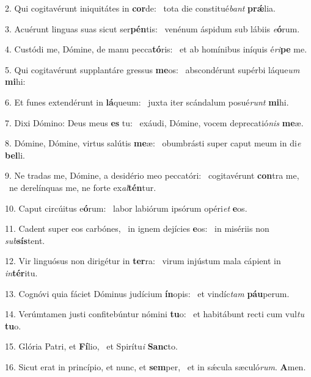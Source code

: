 2. Qui cogitavérunt iniquitátes in \textbf{cor}de: \ast\  tota die constitué\textit{bant} \textbf{prǽ}lia.\

3. Acuérunt linguas suas sicut ser\textbf{pén}tis: \ast\  venénum áspidum sub lábiis \textit{e}\textbf{ó}rum.\

4. Custódi me, Dómine, de manu pecca\textbf{tó}ris: \ast\  et ab homínibus iníquis é\textit{ri}\textbf{pe} me.\

5. Qui cogitavérunt supplantáre gressus \textbf{me}os: \ast\  abscondérunt supérbi láque\textit{um} \textbf{mi}hi:\

6. Et funes extendérunt in \textbf{lá}queum: \ast\  juxta iter scándalum posué\textit{runt} \textbf{mi}hi.\

7. Dixi Dómino: Deus meus \textbf{es} tu: \ast\  exáudi, Dómine, vocem deprecatió\textit{nis} \textbf{me}æ.\

8. Dómine, Dómine, virtus salútis \textbf{me}æ: \ast\  obumbrásti super caput meum in di\textit{e} \textbf{bel}li.\

9. Ne tradas me, Dómine, a desidério meo peccatóri: \dag\  cogitavérunt \textbf{con}tra me, \ast\  ne derelínquas me, ne forte ex\textit{al}\textbf{tén}tur.\

10. Caput circúitus e\textbf{ó}rum: \ast\  labor labiórum ipsórum opéri\textit{et} \textbf{e}os.\

11. Cadent super eos carbónes, \dag\  in ignem dejícies \textbf{e}os: \ast\  in misériis non \textit{sub}\textbf{sís}tent.\

12. Vir linguósus non dirigétur in \textbf{ter}ra: \ast\  virum injústum mala cápient in \textit{in}\textbf{tér}itu.\

13. Cognóvi quia fáciet Dóminus judícium \textbf{ín}opis: \ast\  et vindíc\textit{tam} \textbf{páu}perum.\

14. Verúmtamen justi confitebúntur nómini \textbf{tu}o: \ast\  et habitábunt recti cum vul\textit{tu} \textbf{tu}o.\

15. Glória Patri, et \textbf{Fí}lio, \ast\  et Spirítu\textit{i} \textbf{Sanc}to.\

16. Sicut erat in princípio, et nunc, et \textbf{sem}per, \ast\  et in sǽcula sæculó\textit{rum}. \textbf{A}men.\

